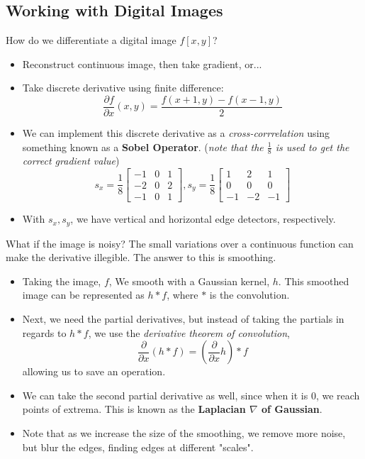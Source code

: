 \documentclass{article}
\begin{document}
\subsection{Working with Digital Images}
How do we differentiate a digital image $f[x,y]$?
\begin{itemize}
    \item Reconstruct continuous image, then take gradient, or...
    \item Take discrete derivative using finite difference:
    $$\frac{\partial f}{\partial x}(x,y) = \frac{f(x+1,y) - f(x-1,y)}{2}$$
    \item We can implement this discrete derivative as a \textit{cross-corrrelation} using something known as a \textbf{Sobel Operator}. (\textit{note that the $\frac{1}{8}$ is used to get the correct gradient value})
$$s_x= \frac{1}{8}
\begin{bmatrix}
-1 & 0 & 1\\
-2 & 0 & 2\\
-1 & 0 & 1
\end{bmatrix}
, s_y = \frac{1}{8}
\begin{bmatrix}
1 & 2 & 1\\
0 & 0 & 0\\
-1 & -2 & -1
\end{bmatrix}
$$
\item With $s_x,s_y$, we have vertical and horizontal edge detectors, respectively.
\end{itemize}
What if the image is noisy? The small variations over a continuous function can make the derivative illegible. The answer to this is smoothing. 
\begin{itemize}
    \item Taking the image, $f$, We smooth with a Gaussian kernel, $h$. This smoothed image can be represented as $h*f$, where $*$ is the convolution.
    \item Next, we need the partial derivatives, but instead of taking the partials in regards to $h*f$, we use the \textit{derivative theorem of convolution}, 
    $$\frac{\partial}{\partial x}(h*f) = (\frac{\partial}{\partial x}h)*f$$
    allowing us to save an operation.
    \item We can take the second partial derivative as well, since when it is 0, we reach points of extrema.  This is known as the \textbf{Laplacian $\nabla$ of Gaussian}.
    \item Note that as we increase the size of the smoothing, we remove more noise, but blur the edges, finding edges at different "scales".
\end{itemize}
\end{document}
